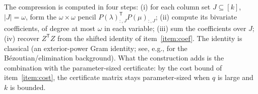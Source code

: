 \begin{remark}\label{rem:algo}
	The compression is computed in four steps:
	(i) for each column set $J\subseteq[k]$, $|J|=\omega$, form the
	$\omega\times\omega$ pencil $P(\lambda)_{:,J}^{\mathsf T}P(\mu)_{:,J}$;
	(ii) compute its bivariate coefficients, of degree at most $\omega$ in
	each variable;
	(iii) sum the coefficients over $J$;
	(iv) recover $Z^{\mathsf T}Z$ from the shifted identity of
	item~\ref{item:coef}.
	The identity is classical (an exterior-power Gram identity; see, e.g.,
	\cite{emi99} for the B\'ezoutian/elimination background). What the
	construction adds is the combination with the parameter-sized
	certificate: by the cost bound of item~\ref{item:cost}, the certificate
	matrix stays parameter-sized when $q$ is large and $k$ is bounded.
\end{remark}
